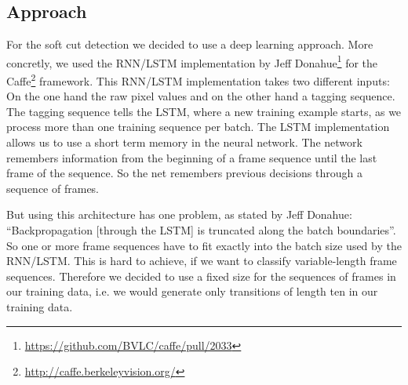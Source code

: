 \subsection{Approach}
\label{sec:soft_cut_approach}

For the soft cut detection we decided to use a deep learning approach.
More concretly, we used the RNN/LSTM implementation by Jeff Donahue\footnote{\url{https://github.com/BVLC/caffe/pull/2033}} for the Caffe\footnote{\url{http://caffe.berkeleyvision.org/}} framework.
This RNN/LSTM implementation takes two different inputs: On the one hand the raw pixel values and on the other hand a tagging sequence.
The tagging sequence tells the LSTM, where a new training example starts, as we process more than one training sequence per batch.
The LSTM implementation allows us to use a short term memory in the neural network.
The network remembers information from the beginning of a frame sequence until the last frame of the sequence.
So the net remembers previous decisions through a sequence of frames.

But using this architecture has one problem, as stated by Jeff Donahue: ``Backpropagation [through the LSTM] is truncated along the batch boundaries''. %
So one or more frame sequences have to fit exactly into the batch size used by the RNN/LSTM.
This is hard to achieve, if we want to classify variable-length frame sequences.
Therefore we decided to use a fixed size for the sequences of frames in our training data, i.e. we would generate only transitions of length ten in our training data.

